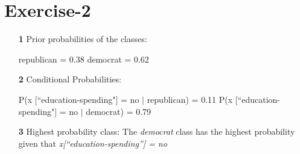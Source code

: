 \documentclass[a4paper]{article}
\begin{document}
\section*{Exercise-2}
	\begin{enumerate}
		\item[ \textbf{1} ] Prior probabilities of the classes:
		
		\begin{tcolorbox}
		\hspace*{2em} republican = 0.38 \newline
		\hspace*{2em} democrat = 0.62
		\end{tcolorbox}
		
		\item[ \textbf{2} ] Conditional Probabilities:
		\begin{tcolorbox}
		\hspace*{2em} P(x [``education-spending"] = no $|$ republican) = 0.11 \newline
		\hspace*{2em} P(x [``education-spending"] = no $|$ democrat) = 0.79
		\end{tcolorbox}
		
	    \item[ \textbf{3} ] Highest probability class: \newline
	    The \textit{democrat} class has the highest probability given that \textit{x[``education-spending”] = no}
	    
	\end{enumerate}
\end{document}
